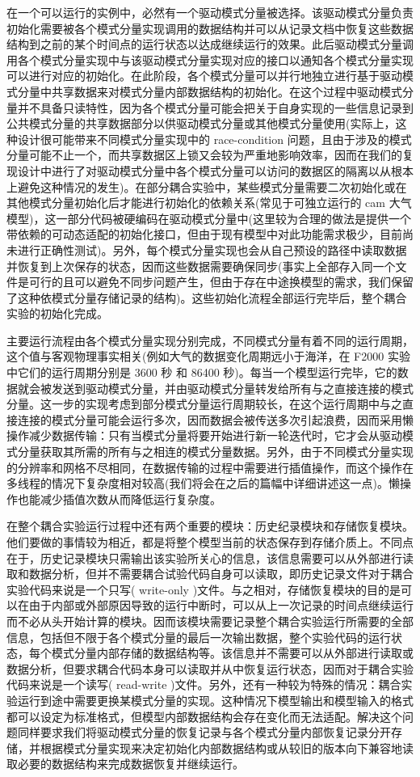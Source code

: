 在一个可以运行的实例中，必然有一个驱动模式分量被选择。该驱动模式分量负责初始化需要被各个模式分量实现调用的数据结构并可以从记录文档中恢复这些数据结构到之前的某个时间点的运行状态以达成继续运行的效果。此后驱动模式分量调用各个模式分量实现中与该驱动模式分量实现对应的接口以通知各个模式分量实现可以进行对应的初始化。在此阶段，各个模式分量可以并行地独立进行基于驱动模式分量中共享数据来对模式分量内部数据结构的初始化。在这个过程中驱动模式分量并不具备只读特性，因为各个模式分量可能会把关于自身实现的一些信息记录到公共模式分量的共享数据部分以供驱动模式分量或其他模式分量使用(实际上，这种设计很可能带来不同模式分量实现中的 race-condition 问题，且由于涉及的模式分量可能不止一个，而共享数据区上锁又会较为严重地影响效率，因而在我们的复现设计中进行了对驱动模式分量中各个模式分量可以访问的数据区的隔离以从根本上避免这种情况的发生)。在部分耦合实验中，某些模式分量需要二次初始化或在其他模式分量初始化后才能进行初始化的依赖关系(常见于可独立运行的 cam 大气模型)，这一部分代码被硬编码在驱动模式分量中(这里较为合理的做法是提供一个带依赖的可动态适配的初始化接口，但由于现有模型中对此功能需求极少，目前尚未进行正确性测试)。另外，每个模式分量实现也会从自己预设的路径中读取数据并恢复到上次保存的状态，因而这些数据需要确保同步(事实上全部存入同一个文件是可行的且可以避免不同步问题产生，但由于存在中途换模型的需求，我们保留了这种依模式分量存储记录的结构)。这些初始化流程全部运行完毕后，整个耦合实验的初始化完成。

主要运行流程由各个模式分量实现分别完成，不同模式分量有着不同的运行周期，这个值与客观物理事实相关(例如大气的数据变化周期远小于海洋，在 F2000 实验中它们的运行周期分别是 3600 秒 和 86400 秒)。每当一个模型运行完毕，它的数据就会被发送到驱动模式分量，并由驱动模式分量转发给所有与之直接连接的模式分量。这一步的实现考虑到部分模式分量运行周期较长，在这个运行周期中与之直接连接的模式分量可能会运行多次，因而数据会被传送多次引起浪费，因而采用懒操作减少数据传输：只有当模式分量将要开始进行新一轮迭代时，它才会从驱动模式分量获取其所需的所有与之相连的模式分量数据。另外，由于不同模式分量实现的分辨率和网格不尽相同，在数据传输的过程中需要进行插值操作，而这个操作在多线程的情况下复杂度相对较高(我们将会在之后的篇幅中详细讲述这一点)。懒操作也能减少插值次数从而降低运行复杂度。

在整个耦合实验运行过程中还有两个重要的模块：历史纪录模块和存储恢复模块。他们要做的事情较为相近，都是将整个模型当前的状态保存到存储介质上。不同点在于，历史记录模块只需输出该实验所关心的信息，该信息需要可以从外部进行读取和数据分析，但并不需要耦合试验代码自身可以读取，即历史记录文件对于耦合实验代码来说是一个只写( write-only )文件。与之相对，存储恢复模块的目的是可以在由于内部或外部原因导致的运行中断时，可以从上一次记录的时间点继续运行而不必从头开始计算的模块。因而该模块需要记录整个耦合实验运行所需要的全部信息，包括但不限于各个模式分量的最后一次输出数据，整个实验代码的运行状态，每个模式分量内部存储的数据结构等。该信息并不需要可以从外部进行读取或数据分析，但要求耦合代码本身可以读取并从中恢复运行状态，因而对于耦合实验代码来说是一个读写( read-write )文件。另外，还有一种较为特殊的情况：耦合实验运行到途中需要更换某模式分量的实现。这种情况下模型输出和模型输入的格式都可以设定为标准格式，但模型内部数据结构会存在变化而无法适配。解决这个问题同样要求我们将驱动模式分量的恢复记录与各个模式分量内部恢复记录分开存储，并根据模式分量实现来决定初始化内部数据结构或从较旧的版本向下兼容地读取必要的数据结构来完成数据恢复并继续运行。

